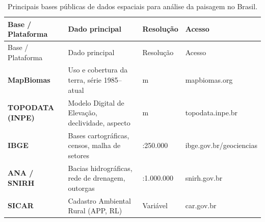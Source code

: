 \documentclass[
  portuguese,
  11pt,
  a4paper,
  open=any]{scrbook}
\begin{document}
\begin{longtable}[]{@{}
  >{\raggedright\arraybackslash}p{}
  >{\raggedright\arraybackslash}p{}
  >{\centering\arraybackslash}p{}
  >{\centering\arraybackslash}p{}@{}}
\caption{Principais bases públicas de dados espaciais para análise da
paisagem no Brasil.}\label{tbl-bases-publicas}\tabularnewline
\toprule\noalign{}
\begin{minipage}[b]{\linewidth}\raggedright
Base / Plataforma
\end{minipage} & \begin{minipage}[b]{\linewidth}\raggedright
Dado principal
\end{minipage} & \begin{minipage}[b]{\linewidth}\centering
Resolução
\end{minipage} & \begin{minipage}[b]{\linewidth}\centering
Acesso
\end{minipage} \\
\midrule\noalign{}
\endfirsthead
\toprule\noalign{}
\begin{minipage}[b]{\linewidth}\raggedright
Base / Plataforma
\end{minipage} & \begin{minipage}[b]{\linewidth}\raggedright
Dado principal
\end{minipage} & \begin{minipage}[b]{\linewidth}\centering
Resolução
\end{minipage} & \begin{minipage}[b]{\linewidth}\centering
Acesso
\end{minipage} \\
\midrule\noalign{}
\endhead
\bottomrule\noalign{}
\endlastfoot
\textbf{MapBiomas} & Uso e cobertura da terra, série 1985--atual & 30 m
& mapbiomas.org \\
\textbf{TOPODATA (INPE)} & Modelo Digital de Elevação, declividade,
aspecto & 30 m & topodata.inpe.br \\
\textbf{IBGE} & Bases cartográficas, censos, malha de setores &
1:250.000 & ibge.gov.br/geociencias \\
\textbf{ANA / SNIRH} & Bacias hidrográficas, rede de drenagem, outorgas
& 1:1.000.000 & snirh.gov.br \\
\textbf{SICAR} & Cadastro Ambiental Rural (APP, RL) & Variável &
car.gov.br \\

\end{longtable}
\end{document}

